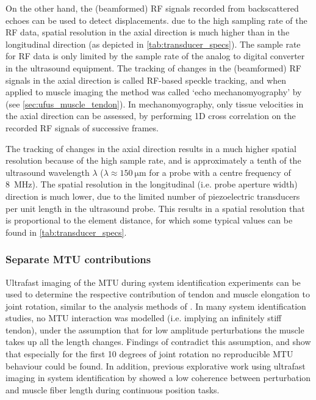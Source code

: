 On the other hand, the (beamformed) RF signals recorded from backscattered echoes can be used to detect displacements.  due to the high sampling rate of the RF data, spatial resolution in the axial direction is much higher than in the longitudinal direction (as depicted in \autoref{tab:transducer_specs}). The sample rate for RF data is only limited by the sample rate of the analog to digital converter in the ultrasound equipment. The tracking of changes in the (beamformed) RF signals in the axial direction is called RF-based speckle tracking, and when applied to muscle imaging the method was called `echo mechanomyography' by \citet{deffieux_assessment_2008}  (see \autoref{sec:ufus_muscle_tendon}). In mechanomyography, only tissue velocities in the axial direction can be assessed, by performing 1D cross correlation on the recorded RF signals of successive frames. 

The tracking of changes in the axial direction results in a much higher spatial resolution because of the high sample rate, and is approximately a tenth of the ultrasound wavelength $\lambda$ ($\lambda \approx \SI{150}{\micro\meter}$ for a probe with a centre frequency of \SI{8}{\mega\hertz}). The spatial resolution in the longitudinal (i.e. probe aperture width) direction is much lower, due to the limited number of piezoelectric transducers per unit length in the ultrasound probe. This results in a spatial resolution that is proportional to the element distance, for which some typical values can be found in \autoref{tab:transducer_specs}. 





\subsubsection{Separate MTU contributions}
Ultrafast imaging of the MTU during system identification experiments can be used to determine the respective contribution of tendon and muscle elongation to joint rotation, similar to the analysis methods of \citeauthor{hauraix_shortening_2013} \cite{hauraix_shortening_2013, hauraix_muscle_2017}. In many system identification studies, no MTU interaction was modelled (i.e. implying an infinitely stiff tendon), under the assumption that for low amplitude perturbations the muscle takes up all the length changes. Findings of \citet{hauraix_shortening_2013} contradict this assumption, and show that especially for the first 10 degrees of joint rotation no reproducible MTU behaviour could be found. In addition, previous explorative work using ultrafast imaging in system identification by \citet{ossenkoppele_using_2018} showed a low coherence between perturbation and muscle fiber length during continuous position tasks. 

